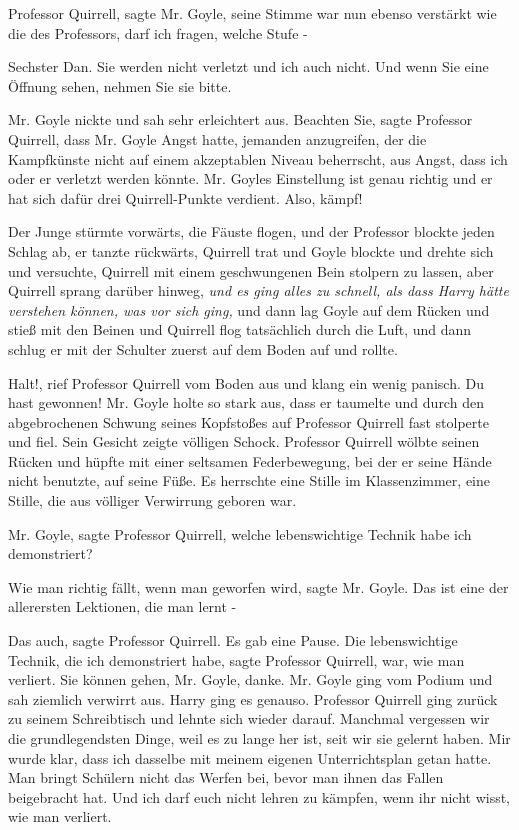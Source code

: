 \glqq Professor Quirrell\grqq{}, sagte Mr. Goyle, seine Stimme war nun ebenso
verstärkt wie die des Professors, \glqq darf ich fragen, welche Stufe -\grqq{}

\glqq Sechster Dan. Sie werden nicht verletzt und ich auch nicht. Und wenn Sie
eine Öffnung sehen, nehmen Sie sie bitte.\grqq{}

Mr. Goyle nickte und sah sehr erleichtert aus. \glqq Beachten Sie\grqq{}, sagte
Professor Quirrell, \glqq dass Mr. Goyle Angst hatte, jemanden anzugreifen, der
die Kampfkünste nicht auf einem akzeptablen Niveau beherrscht, aus Angst, dass
ich oder er verletzt werden könnte. Mr. Goyles Einstellung ist genau richtig und
er hat sich dafür drei Quirrell-Punkte verdient. Also, kämpf!\grqq{}

Der Junge stürmte vorwärts, die Fäuste flogen, und der Professor blockte jeden
Schlag ab, er tanzte rückwärts, Quirrell trat und Goyle blockte und drehte sich
und versuchte, Quirrell mit einem geschwungenen Bein stolpern zu lassen, aber
Quirrell sprang darüber hinweg, \emph{und es ging alles zu schnell, als dass
Harry hätte verstehen können, was vor sich ging,} und dann lag Goyle auf dem
Rücken und stieß mit den Beinen und Quirrell flog tatsächlich durch die Luft,
und dann schlug er mit der Schulter zuerst auf dem Boden auf und rollte.

\glqq Halt!\grqq{}, rief Professor Quirrell vom Boden aus und klang ein wenig
panisch. \glqq Du hast gewonnen!\grqq{} Mr. Goyle holte so stark aus, dass er
taumelte und durch den abgebrochenen Schwung seines Kopfstoßes auf Professor
Quirrell fast stolperte und fiel. Sein Gesicht zeigte völligen Schock. Professor
Quirrell wölbte seinen Rücken und hüpfte mit einer seltsamen Federbewegung, bei
der er seine Hände nicht benutzte, auf seine Füße. Es herrschte eine Stille im
Klassenzimmer, eine Stille, die aus völliger Verwirrung geboren war.

\glqq Mr. Goyle\grqq{}, sagte Professor Quirrell, \glqq welche lebenswichtige
Technik habe ich demonstriert?\grqq{}

\glqq Wie man richtig fällt, wenn man geworfen wird\grqq{}, sagte Mr. Goyle.
\glqq Das ist eine der allerersten Lektionen, die man lernt -\grqq{}

\glqq Das auch\grqq{}, sagte Professor Quirrell. Es gab eine Pause. \glqq Die
lebenswichtige Technik, die ich demonstriert habe\grqq{}, sagte Professor
Quirrell, \glqq war, wie man verliert. Sie können gehen, Mr. Goyle,
danke.\grqq{} Mr. Goyle ging vom Podium und sah ziemlich verwirrt aus. Harry
ging es genauso. Professor Quirrell ging zurück zu seinem Schreibtisch und
lehnte sich wieder darauf. \glqq Manchmal vergessen wir die grundlegendsten
Dinge, weil es zu lange her ist, seit wir sie gelernt haben. Mir wurde klar,
dass ich dasselbe mit meinem eigenen Unterrichtsplan getan hatte. Man bringt
Schülern nicht das Werfen bei, bevor man ihnen das Fallen beigebracht hat. Und
ich darf euch nicht lehren zu kämpfen, wenn ihr nicht wisst, wie man
verliert.\grqq{}

